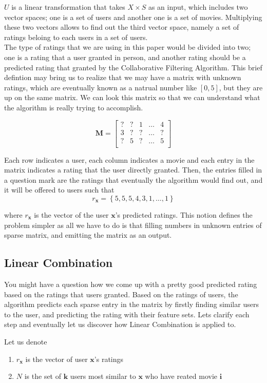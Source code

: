 \documentclass[paper=a4, fontsize=12pt]{scrartcl} %
\numberwithin{equation}{section} %
\numberwithin{figure}{section} %
\numberwithin{table}{section} %
\newcommand{\matxxx}[3] {
\begin{bmatrix}
  #1 \\
  #2 \\
  #3 \\
\end{bmatrix}
}
\begin{document}
  \(U\) is a linear transformation that takes \(X \times S\) as an input, which
  includes two vector spaces; one is a set of users and another one is a set of
  movies. Multiplying these two vectors allows to find out the third vector
  space, namely a set of ratings beloing to each users in a set of users. \\

  The type of ratings that we are using in this paper would be divided into two;
  one is a rating that a user granted in person, and another rating should be a
  predicted rating that granted by the Collaborative Filtering Algorithm. This
  brief defintion may bring us to realize that we may have a matrix with unknown
  ratings, which are eventually known as a natrual number like \([0,5]\), but
  they are up on the same matrix. We can look this matrix so that we can
  understand what the algorithm is really trying to accomplish.

	\[
		\mathbf{M} =
		\matxxx
		{? & ? & 1 & \dots & 4}
		{3 & ? & ? & \dots & ?}
		{? & 5 & ? & \dots & 5}
	\]

  Each row indicates a user, each column indicates a movie and each entry in the
  matrix indicates a rating that the user directly granted. Then, the entries
  filled in a question mark are the ratings that eventually the algorithm would
  find out, and it will be offered to users such that
  \[
    r_{\mathbf{x}} = \left\{5,5,5,4,3,1,\dots,1\right\}
  \]

  where \(r_\mathbf{x}\) is the vector of the user \(\mathbf{x}\)'s predicted ratings. This
  notion defines the problem simpler as all we have to do is that filling
  numbers in unknown entries of sparse matrix, and emitting the matrix as an
  output.

  \subsection{Linear Combination}

  You might have a question how we come up with a pretty good predicted rating
  based on the ratings that users granted. Based on the ratings of users, the
  algorithm predicts each sparse entry in the matrix by firstly finding similar
  users to the user, and predicting the rating with their feature sets. Lets
  clarify each step and eventually let us discover how Linear Combination is
  applied to.

  Let us denote
  \begin{enumerate}
  \item \(r_{\mathbf{x}}\) is the vector of user \(\mathbf{x}\)'s ratings
  \item \(N\) is the set of \(\mathbf{k}\) users most similar to \(\mathbf{x}\)
    who have reated movie \(\mathbf{i}\)
  \end{enumerate}
\end{document}
